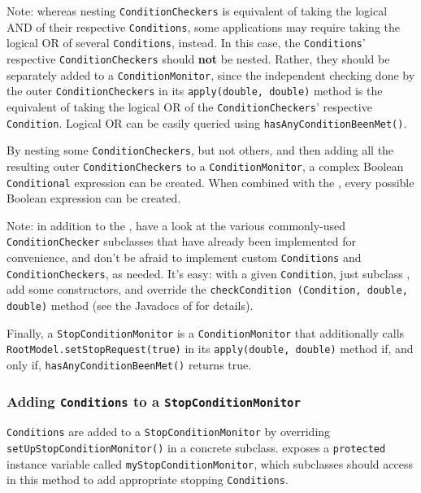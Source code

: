 \documentclass{article}
\begin{document}
\begin{sideblock}
Note: whereas nesting {\tt ConditionCheckers} is equivalent of taking the logical AND of their respective {\tt Conditions}, some applications may require taking the logical OR of several {\tt Conditions}, instead. In this case, the {\tt Conditions}' respective {\tt ConditionCheckers} should \textbf{not} be nested. Rather, they should be separately added to a {\tt ConditionMonitor}, since the independent checking done by the outer {\tt ConditionCheckers} in its {\tt apply(double, double)} method is the equivalent of taking the logical OR of the {\tt ConditionCheckers}' respective {\tt Condition}. Logical OR can be easily queried using {\tt hasAnyConditionBeenMet()}.
\end{sideblock}

By nesting some {\tt ConditionCheckers}, but not others, and then adding all the resulting outer {\tt ConditionCheckers} to a {\tt ConditionMonitor}, a complex Boolean {\tt Conditional} expression can be created. When combined with the , every possible Boolean expression can be created.

\begin{sideblock}
Note: in addition to the , have a look at the various commonly-used {\tt ConditionChecker} subclasses that have already been implemented for convenience, and don't be afraid to implement custom {\tt Conditions} and {\tt ConditionCheckers}, as needed. It's easy: with a given {\tt Condition}, just subclass , add some constructors, and override the {\tt checkCondition (Condition, double, double)} method (see the Javadocs of  for details).
\end{sideblock}

Finally, a {\tt StopConditionMonitor} is a {\tt ConditionMonitor} that additionally calls {\tt RootModel.setStopRequest(true)} in its {\tt apply(double, double)} method if, and only if, {\tt hasAnyConditionBeenMet()} returns true.

\subsubsection{Adding {\tt Conditions} to a {\tt StopConditionMonitor}}

{\tt Conditions} are added to a {\tt StopConditionMonitor} by overriding {\tt setUpStopConditionMonitor()} in a concrete  subclass.  exposes a {\tt protected} instance variable called {\tt myStopConditionMonitor}, which subclasses should access in this method to add appropriate stopping {\tt Conditions}.
\end{document}
